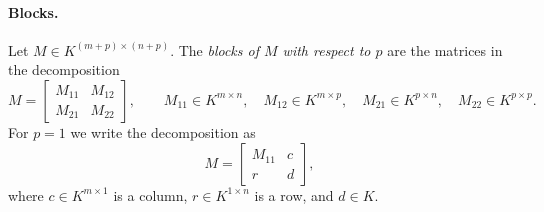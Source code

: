 \documentclass[11pt,a4paper]{article}
\theoremstyle{plain}
\theoremstyle{definition}
\theoremstyle{remark}
\begin{document}
\paragraph{Blocks.}
Let $M \in K^{(m+p) \times (n+p)}$.
The \emph{blocks of $M$ with respect to $p$} are the matrices in the decomposition
\begin{equation}
    \label{eq:blocks}
    M = \begin{bmatrix} M_{11} & M_{12} \\ M_{21} & M_{22} \end{bmatrix},
    \qquad
    M_{11} \in K^{m \times n}, \quad
    M_{12} \in K^{m \times p}, \quad
    M_{21} \in K^{p \times n}, \quad
    M_{22} \in K^{p \times p} .
\end{equation}
For $p = 1$ we write the decomposition as
\begin{equation}
    \label{eq:blocks-one}
    M = \begin{bmatrix} M_{11} & c \\ r & d \end{bmatrix},
\end{equation}
where $c \in K^{m \times 1}$ is a column, $r \in K^{1 \times n}$ is a row, and $d \in K$.
\end{document}
